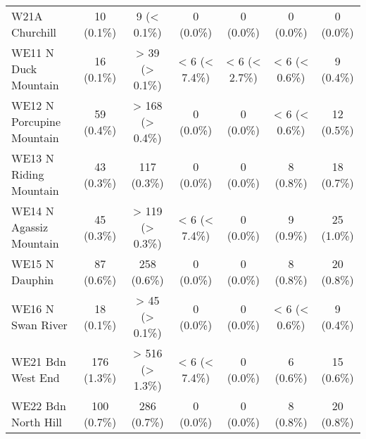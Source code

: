\documentclass{article}
\begin{document}
\begin{table}[htbp]
\begin{tabular}{l*{6}{c}}
  W21A Churchill                                        &            10 (0.1\%)           &           9 (< 0.1\%)           &            0 (0.0\%)            &            0 (0.0\%)            &            0 (0.0\%)            &            0 (0.0\%)            \\
  WE11 N Duck Mountain                                  &            16 (0.1\%)           &          > 39 (> 0.1\%)         &          < 6 (< 7.4\%)          &          < 6 (< 2.7\%)          &          < 6 (< 0.6\%)          &            9 (0.4\%)            \\
  WE12 N Porcupine Mountain                             &            59 (0.4\%)           &         > 168 (> 0.4\%)         &            0 (0.0\%)            &            0 (0.0\%)            &          < 6 (< 0.6\%)          &            12 (0.5\%)           \\
  WE13 N Riding Mountain                                &            43 (0.3\%)           &           117 (0.3\%)           &            0 (0.0\%)            &            0 (0.0\%)            &            8 (0.8\%)            &            18 (0.7\%)           \\
  WE14 N Agassiz Mountain                               &            45 (0.3\%)           &         > 119 (> 0.3\%)         &          < 6 (< 7.4\%)          &            0 (0.0\%)            &            9 (0.9\%)            &            25 (1.0\%)           \\
  WE15 N Dauphin                                        &            87 (0.6\%)           &           258 (0.6\%)           &            0 (0.0\%)            &            0 (0.0\%)            &            8 (0.8\%)            &            20 (0.8\%)           \\
  WE16 N Swan River                                     &            18 (0.1\%)           &          > 45 (> 0.1\%)         &            0 (0.0\%)            &            0 (0.0\%)            &          < 6 (< 0.6\%)          &            9 (0.4\%)            \\
  WE21 Bdn West End                                     &           176 (1.3\%)           &         > 516 (> 1.3\%)         &          < 6 (< 7.4\%)          &            0 (0.0\%)            &            6 (0.6\%)            &            15 (0.6\%)           \\
  WE22 Bdn North Hill                                   &           100 (0.7\%)           &           286 (0.7\%)           &            0 (0.0\%)            &            0 (0.0\%)            &            8 (0.8\%)            &            20 (0.8\%)           \\

\end{tabular}
\end{table}
\end{document}
